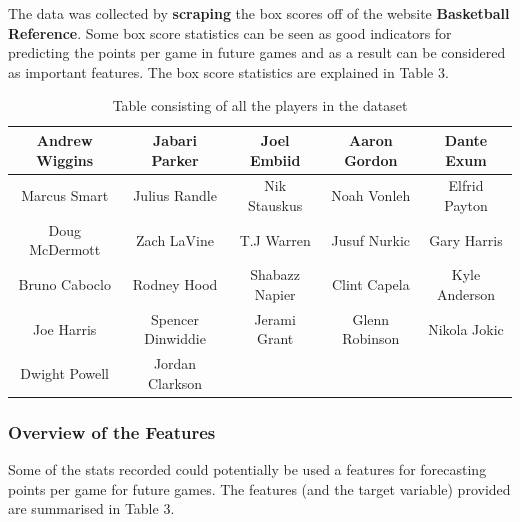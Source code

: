 \documentclass[a4paper,11pt,twoside]{article}
\begin{document}
The data was collected by \textbf{scraping} the box scores off of the website \textbf{Basketball Reference}. Some box score statistics can be seen as good indicators for predicting the points per game in future games and as a result can be considered as important features. The box score statistics are explained in Table 3.

\vspace{5mm}
\begin{table} [h!]
\begin{center}
\begin{tabular}{ ccccc } 
 \hline
Andrew Wiggins & Jabari Parker & Joel Embiid & Aaron  Gordon& Dante Exum \\ 
 \hline
Marcus Smart & Julius Randle & Nik Stauskus & Noah Vonleh & Elfrid Payton \\ 
 \hline
 Doug McDermott & Zach LaVine & T.J Warren & Jusuf Nurkic & Gary Harris\\
 \hline
 Bruno Caboclo & Rodney Hood & Shabazz Napier & Clint Capela & Kyle Anderson\\
 \hline 
 Joe Harris & Spencer Dinwiddie & Jerami Grant & Glenn Robinson & Nikola Jokic\\
 \hline
  Dwight Powell & Jordan Clarkson\\
\hline
\end{tabular}
\caption{Table consisting of all the players in the dataset}
\end{center}
\end{table}

 \subsubsection{Overview of the Features}
Some of the stats recorded could potentially be used a features for forecasting points per game for future games. The features (and the target variable) provided are summarised in Table 3. 
\end{document}
